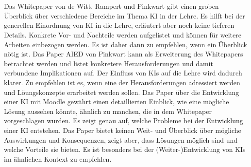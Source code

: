 \\ \\ \noindent
Das Whitepaper von de Witt, Rampert und Pinkwart gibt einen groben Überblick über verschiedene Bereiche im Thema KI in der Lehre. Es hilft bei der generellen Einordnung von KI in die Lehre, erläutert aber noch keine tieferen Details. Konkrete Vor- und Nachteile werden aufgelistet und können für weitere Arbeiten einbezogen werden. Es ist daher dann zu empfehlen, wenn ein Überblick nötig ist. Das Paper AIED von Pinkwart kann als Erweiterung des Whitepapers betrachtet werden und listet konkretere Herausforderungen und damit verbundene Implikationen auf. Der Einfluss von KIs auf die Lehre wird dadurch klarer. Zu empfehlen ist es, wenn eine der Herausforderungen adressiert werden und Löungskonzepte erarbeitet werden sollen. Das Paper über die Entwicklung einer KI mit Moodle gewährt einen detaillierten Einblick, wie eine mögliche Lösung aussehen könnte, ähnlich zu manchen, die in dem Whitepaper vorgeschlagen wurden. Es zeigt genau auf, welche Probleme bei der Entwicklung einer KI entstehen. Das Paper bietet keinen Weit- und Überblick über mögliche Auswirkungen und Konsequenzen, zeigt aber, dass Lösungen möglich sind und welche Vorteile sie bieten. Es ist besonders bei der (Weiter-)Entwicklung von KIs im ähnlichen Kontext zu empfehlen.